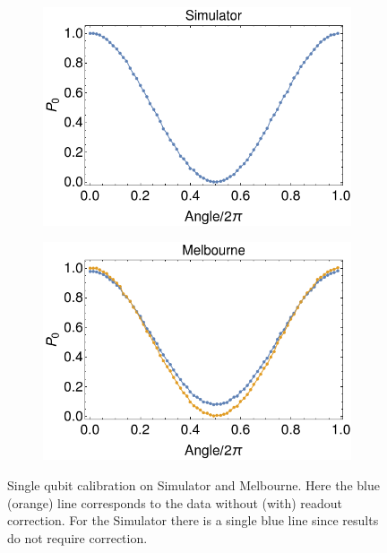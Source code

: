 \begin{figure}[H]
    \centering
    \begin{subfigure}{.5\textwidth}
      \centering
      \includegraphics[width=\textwidth]{Figures/Calibrations/calibration_simulator.png}
    \end{subfigure}%
    \begin{subfigure}{.5\textwidth}
      \centering
      \includegraphics[width=\textwidth]{Figures/Calibrations/calibration_melbourne.png}
    \end{subfigure}
    \caption{Single qubit calibration on Simulator and Melbourne. Here the blue (orange) line corresponds to the data without (with) readout correction. For the Simulator there is a single blue line since results do not require correction.}
    \label{fig:pc_yorktown_sphere}
\end{figure}

